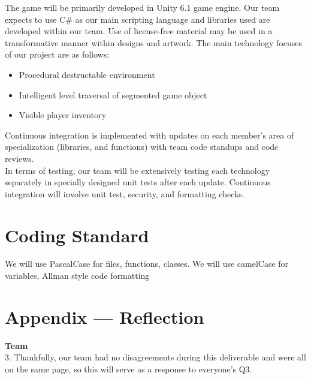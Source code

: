 \documentclass{article}
\begin{document}
The game will be primarily developed in Unity 6.1 game engine. Our team expects to use C\# as our main scripting language and libraries used are developed within our team. Use of license-free material may be used in a transformative manner within designs and artwork. The main technology focuses of our project are as follows:
\begin{itemize}
\item{Procedural destructable environment}
\item{Intelligent level traversal of segmented game object}
\item{Visible player inventory}
\end{itemize}

Continuous integration is implemented with updates on each member’s area of specialization (libraries, and functions) with team code standups and code reviews.\\

In terms of testing, our team will be extensively testing each technology separately in specially designed unit tests after each update. Continuous integration will involve unit test, security, and formatting checks.\\


\section{Coding Standard}

We will use PascalCase for files, functions, classes. We will use camelCase for variables, Allman style code formatting\\

\newpage{}

\section*{Appendix --- Reflection}

\textbf{Team}\\
3. Thankfully, our team had no disagreements during this deliverable and were all on the same page, 
so this will serve as a response to everyone's Q3.\\
\end{document}
